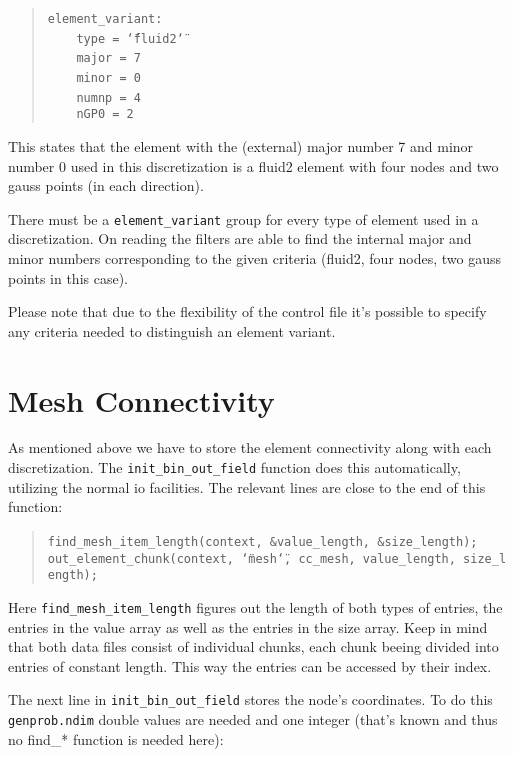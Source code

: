 \begin{quote}
\texttt{element{\_}variant:~}~\\
 \texttt{~~~~type~=~\char`\"{}fluid2\char`\"{}~}~\\
 \texttt{~~~~major~=~7~}~\\
 \texttt{~~~~minor~=~0~}~\\
 \texttt{~~~~numnp~=~4~}~\\
 \texttt{~~~~nGP0~=~2 }
\end{quote}
This states that the element with the (external) major number 7 and
minor number 0 used in this discretization is a fluid2 element with
four nodes and two gauss points (in each direction).

There must be a \texttt{element{\_}variant} group for every type
of element used in a discretization. On reading the filters are able
to find the internal major and minor numbers corresponding to the
given criteria (fluid2, four nodes, two gauss points in this case).

Please note that due to the flexibility of the control file it's possible
to specify any criteria needed to distinguish an element variant.


\section{Mesh Connectivity}

As mentioned above we have to store the element connectivity along
with each discretization. The \texttt{init{\_}bin{\_}out{\_}field}
function does this automatically, utilizing the normal io facilities.
The relevant lines are close to the end of this function: 

\begin{quote}
\texttt{find{\_}mesh{\_}item{\_}length(context,~{\&}value{\_}length,~{\&}size{\_}length);~}~\\
 \texttt{out{\_}element{\_}chunk(context,~\char`\"{}mesh\char`\"{},~cc{\_}mesh,~value{\_}length,~size{\_}length); }
\end{quote}
Here \texttt{find{\_}mesh{\_}item{\_}length} figures out the
length of both types of entries, the entries in the value array as
well as the entries in the size array. Keep in mind that both data
files consist of individual chunks, each chunk beeing divided into
entries of constant length. This way the entries can be accessed by
their index.

The next line in \texttt{init{\_}bin{\_}out{\_}field} stores
the node's coordinates. To do this \texttt{genprob.ndim} double values
are needed and one integer (that's known and thus no find{\_}{*}
function is needed here): 

